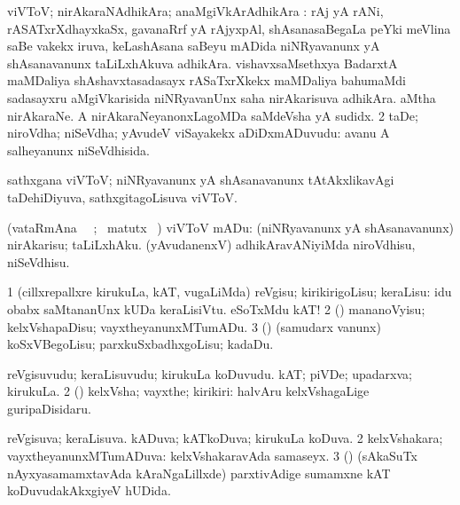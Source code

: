 {{{{\bentry
{} 
\gl{\nA}
\bmng
\emng
\eentry

\bentry
{} 
\gl{\nA}
\bmng
\bnum
{} viVToV; nirAkaraNAdhikAra; anaMgiVkArAdhikAra : 
\banum
{} rAj yA rANi, rASATxrXdhayxkaSx, gavanaRrf yA rAjyxpAl, shAsanasaBegaLa peYki meVlina saBe \mo vakekx iruva, keLashAsana saBeyu mADida niNRyavanunx yA shAsanavanunx taLiLxhAkuva adhikAra. 
 vishavxsaMsethxya BadarxtA maMDaliya shAshavxtasadasayx rASaTxrXkekx maMDaliya bahumaMdi sadasayxru aMgiVkarisida niNRyavanUnx saha nirAkarisuva adhikAra. 
 aMtha nirAkaraNe. 
 A nirAkaraNeyanonxLagoMDa saMdeVsha yA sudidx. 
\eanum
\numie
\num{2} taDe; niroVdha; niSeVdha; yAvudeV viSayakekx aDiDxmADuvudu:  avanu A salheyanunx niSeVdhisida. 
\enum
\emng

\noindent 
\gl{\pagu}
\expl{}
\bmng
  sathxgana viVToV; niNRyavanunx yA shAsanavanunx tAtAkxlikavAgi taDehiDiyuva, sathxgitagoLisuva viVToV. 
\emng
\eentry

\bentry
{} 
\gl{\sakirx}(vataRmAna \parxpu\ \Eva\ ; \BU\ matutx
\BUkaq\ ) \bmng
 viVToV mADu: 
\banum
{} (niNRyavanunx yA shAsanavanunx) nirAkarisu; taLiLxhAku. 
 (yAvudanenxV) adhikAravANiyiMda niroVdhisu, niSeVdhisu. 
\eanum
\emng
\eentry

\bentry
{} 
\gl{\sakirx}
\expl{}
\bmng
\bnum
\num{1} (cillxrepallxre kirukuLa, kAT, \mo vugaLiMda) reVgisu; kirikirigoLisu; keraLisu:  idu obabx saMtananUnx kUDa keraLisiVtu.  eSoTxMdu kAT! 
\num{2} (\pArxparx) mananoVyisu; kelxVshapaDisu; vayxtheyanunxMTumADu. 
\num{3} (\pArxparx) (samudarx \mo vanunx) koSxVBegoLisu; parxkuSxbadhxgoLisu; kadaDu. 
\enum
\emng
\eentry

\bentry
{} 
\gl{\nA}
\expl{}
\bmng
\bnum
{} 
\banum
{} reVgisuvudu; keraLisuvudu; kirukuLa koDuvudu. 
 kAT; piVDe; upadarxva; kirukuLa. 
\eanum
\numie
\num{2} (\pArxparx) kelxVsha; vayxthe; kirikiri:  halvAru kelxVshagaLige guripaDisidaru. 
\enum
\emng
\eentry

\bentry
{} 
\gl{\gu}
\expl{}
\bmng
\bnum
{} 
\banum
{} reVgisuva; keraLisuva. 
 kADuva; kATkoDuva; kirukuLa koDuva. 
\eanum
\numie
\num{2} kelxVshakara; vayxtheyanunxMTumADuva:  kelxVshakaravAda samaseyx. 
\num{3} (\nAyxshA) (sAkaSuTx nAyxyasamamxtavAda kAraNgaLillxde) parxtivAdige sumamxne kAT koDuvudakAkxgiyeV hUDida. 
\enum
\emng
\eentry

}}}}

